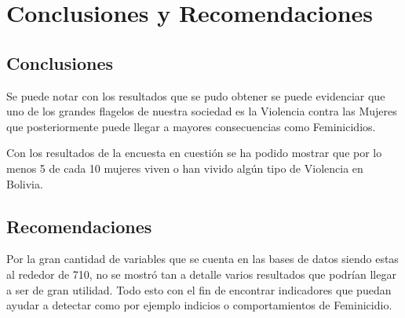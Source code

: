 \documentclass[11pt,letter]{article}
\begin{document}
\section{Conclusiones y Recomendaciones}

\subsection{Conclusiones}
Se puede notar con los resultados que se pudo obtener se puede evidenciar que uno de los grandes flagelos de nuestra sociedad es la Violencia contra las Mujeres que posteriormente puede llegar a mayores consecuencias como Feminicidios. 

Con los resultados de la encuesta en cuestión se ha podido mostrar que por lo menos 5 de cada 10 mujeres viven o han vivido algún tipo de Violencia en Bolivia.

\subsection{Recomendaciones}
Por la gran cantidad de variables que se cuenta en las bases de datos siendo estas al rededor de 710, no se mostró tan a detalle varios resultados que podrían llegar a ser de gran utilidad. Todo esto con el fin de encontrar indicadores que puedan ayudar a detectar como por ejemplo indicios o comportamientos de Feminicidio.


 

\printbibliography
\end{document}
